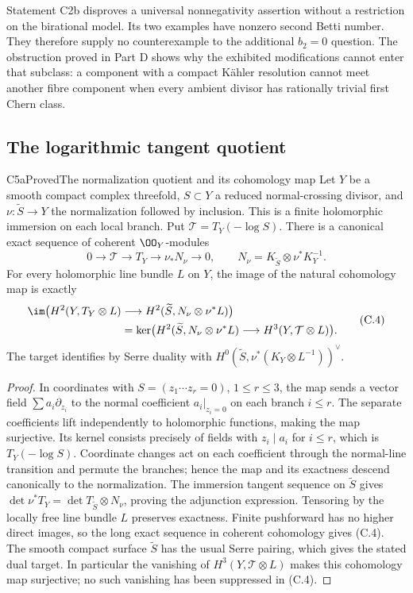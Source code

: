 Statement C2b disproves a universal nonnegativity assertion without a restriction on the birational model. Its two examples have nonzero second Betti number. They therefore supply no counterexample to the additional $b_2=0$ question. The obstruction proved in Part D shows why the exhibited modifications cannot enter that subclass: a component with a compact K\"ahler resolution cannot meet another fibre component when every ambient divisor has rationally trivial first Chern class.

\subsection{The logarithmic tangent quotient}

\begin{statement}{C5a}{Proved}{The normalization quotient and its cohomology map}
Let $Y$ be a smooth compact complex threefold, $S\subset Y$ a reduced normal-crossing divisor, and $\nu:\widetilde S\to Y$ the normalization followed by inclusion. This is a finite holomorphic immersion on each local branch. Put $\mathcal T=T_Y(-\log S)$. There is a canonical exact sequence of coherent $\OO_Y$-modules
\[
0\longrightarrow\mathcal T\longrightarrow T_Y
 \longrightarrow\nu_*N_\nu\longrightarrow0,
\qquad N_\nu=K_{\widetilde S}\otimes\nu^*K_Y^{-1}.      \tag{C.3}
\]
For every holomorphic line bundle $L$ on $Y$, the image of the natural cohomology map is exactly
\[
\begin{split}
\im\bigl(H^2(Y,T_Y\otimes L)&\longrightarrow
 H^2(\widetilde S,N_\nu\otimes\nu^*L)\bigr)\\
 &=\ker\bigl(H^2(\widetilde S,N_\nu\otimes\nu^*L)
 \longrightarrow H^3(Y,\mathcal T\otimes L)\bigr).
\end{split}                                             \tag{C.4}
\]
The target identifies by Serre duality with
$H^0(\widetilde S,\nu^*(K_Y\otimes L^{-1}))^\vee$.
\end{statement}
\begin{proof}
In coordinates with $S=(z_1\cdots z_r=0)$, $1\le r\le3$, the map sends a vector field $\sum a_i\partial_{z_i}$ to the normal coefficient $a_i|_{z_i=0}$ on each branch $i\le r$. The separate coefficients lift independently to holomorphic functions, making the map surjective. Its kernel consists precisely of fields with $z_i\mid a_i$ for $i\le r$, which is $T_Y(-\log S)$. Coordinate changes act on each coefficient through the normal-line transition and permute the branches; hence the map and its exactness descend canonically to the normalization. The immersion tangent sequence on $\widetilde S$ gives $\det\nu^*T_Y=\det T_{\widetilde S}\otimes N_\nu$, proving the adjunction expression. Tensoring by the locally free line bundle $L$ preserves exactness. Finite pushforward has no higher direct images, so the long exact sequence in coherent cohomology gives (C.4). The smooth compact surface $\widetilde S$ has the usual Serre pairing, which gives the stated dual target. In particular the vanishing of $H^3(Y,\mathcal T\otimes L)$ makes this cohomology map surjective; no such vanishing has been suppressed in (C.4).
\end{proof}
